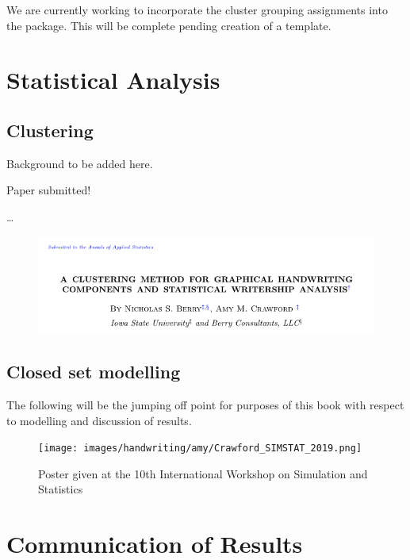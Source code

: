 \documentclass[]{book}
\begin{document}
We are currently working to incorporate the cluster grouping assignments into the package. This will be complete pending creation of a template.

\hypertarget{statistical-analysis}{%
\section{Statistical Analysis}\label{statistical-analysis}}

\hypertarget{clustering}{%
\subsection{Clustering}\label{clustering}}

Background to be added here.

Paper submitted!

\ldots{}

\begin{figure}

{\centering \includegraphics[width=0.8\linewidth]{images/handwriting/amy/clusterpaper_header} 

}

\end{figure}

\hypertarget{closed-set-modelling}{%
\subsection{Closed set modelling}\label{closed-set-modelling}}

The following will be the jumping off point for purposes of this book with respect to modelling and discussion of results.

\begin{figure}
\centering
\texttt{[image: images/handwriting/amy/Crawford\_SIMSTAT\_2019.png]}
\caption{Poster given at the 10th International Workshop on Simulation and Statistics}
\end{figure}

\hypertarget{communication-of-results}{%
\section{Communication of Results}\label{communication-of-results}}
\end{document}
